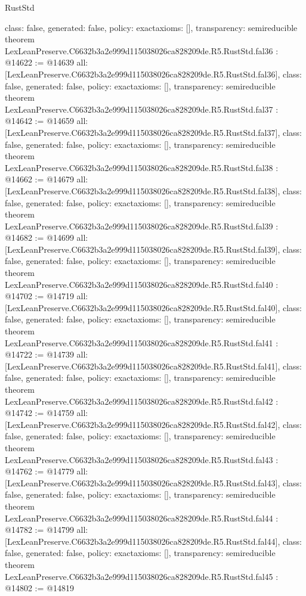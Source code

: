 \begin{lexlean}{RustStd}
\begin{coremodule}
{  class: false,
  generated: false,
  policy: exact{axioms: []},
  transparency: semireducible
}
theorem LexLeanPreserve.C6632b3a2e999d115038026ca828209de.R5.RustStd.fal36 : @14622 := @14639 {
  all: [LexLeanPreserve.C6632b3a2e999d115038026ca828209de.R5.RustStd.fal36],
  class: false,
  generated: false,
  policy: exact{axioms: []},
  transparency: semireducible
}
theorem LexLeanPreserve.C6632b3a2e999d115038026ca828209de.R5.RustStd.fal37 : @14642 := @14659 {
  all: [LexLeanPreserve.C6632b3a2e999d115038026ca828209de.R5.RustStd.fal37],
  class: false,
  generated: false,
  policy: exact{axioms: []},
  transparency: semireducible
}
theorem LexLeanPreserve.C6632b3a2e999d115038026ca828209de.R5.RustStd.fal38 : @14662 := @14679 {
  all: [LexLeanPreserve.C6632b3a2e999d115038026ca828209de.R5.RustStd.fal38],
  class: false,
  generated: false,
  policy: exact{axioms: []},
  transparency: semireducible
}
theorem LexLeanPreserve.C6632b3a2e999d115038026ca828209de.R5.RustStd.fal39 : @14682 := @14699 {
  all: [LexLeanPreserve.C6632b3a2e999d115038026ca828209de.R5.RustStd.fal39],
  class: false,
  generated: false,
  policy: exact{axioms: []},
  transparency: semireducible
}
theorem LexLeanPreserve.C6632b3a2e999d115038026ca828209de.R5.RustStd.fal40 : @14702 := @14719 {
  all: [LexLeanPreserve.C6632b3a2e999d115038026ca828209de.R5.RustStd.fal40],
  class: false,
  generated: false,
  policy: exact{axioms: []},
  transparency: semireducible
}
theorem LexLeanPreserve.C6632b3a2e999d115038026ca828209de.R5.RustStd.fal41 : @14722 := @14739 {
  all: [LexLeanPreserve.C6632b3a2e999d115038026ca828209de.R5.RustStd.fal41],
  class: false,
  generated: false,
  policy: exact{axioms: []},
  transparency: semireducible
}
theorem LexLeanPreserve.C6632b3a2e999d115038026ca828209de.R5.RustStd.fal42 : @14742 := @14759 {
  all: [LexLeanPreserve.C6632b3a2e999d115038026ca828209de.R5.RustStd.fal42],
  class: false,
  generated: false,
  policy: exact{axioms: []},
  transparency: semireducible
}
theorem LexLeanPreserve.C6632b3a2e999d115038026ca828209de.R5.RustStd.fal43 : @14762 := @14779 {
  all: [LexLeanPreserve.C6632b3a2e999d115038026ca828209de.R5.RustStd.fal43],
  class: false,
  generated: false,
  policy: exact{axioms: []},
  transparency: semireducible
}
theorem LexLeanPreserve.C6632b3a2e999d115038026ca828209de.R5.RustStd.fal44 : @14782 := @14799 {
  all: [LexLeanPreserve.C6632b3a2e999d115038026ca828209de.R5.RustStd.fal44],
  class: false,
  generated: false,
  policy: exact{axioms: []},
  transparency: semireducible
}
theorem LexLeanPreserve.C6632b3a2e999d115038026ca828209de.R5.RustStd.fal45 : @14802 := @14819 {
}
\end{coremodule}
\end{lexlean}
